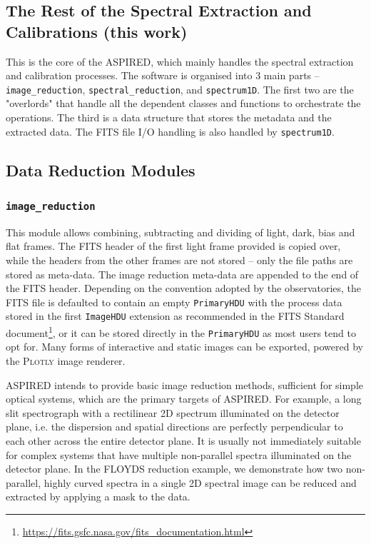 \documentclass[fleqn,usenatbib]{mnras}
\begin{document}
\subsection*{The Rest of the Spectral Extraction and Calibrations (this work)}
This is the core of the \textsc{ASPIRED}, which mainly handles the spectral
extraction and calibration processes. The software is organised into
3 main parts -- \texttt{image\_reduction}, \texttt{spectral\_reduction},
and \texttt{spectrum1D}. The first two are the "overlords" that handle
all the dependent classes and functions to orchestrate the operations.
The third is a data structure that stores the metadata and the extracted
data. The FITS file I/O handling is also handled by \texttt{spectrum1D}.


\subsection{Data Reduction Modules}

\subsubsection{\texttt{image\_reduction}}
This module allows combining, subtracting and dividing of light,
dark, bias and flat frames. The FITS header of the first light frame provided
is copied over, while the headers from the other frames are not stored -- only
the file paths are stored as meta-data. The image reduction meta-data
are appended to the end of the FITS header. Depending on the convention
adopted by the observatories, the FITS file is defaulted to contain an empty \texttt{PrimaryHDU}
with the process data stored in the first \texttt{ImageHDU} extension as
recommended in the FITS Standard 
document\footnote{\url{https://fits.gsfc.nasa.gov/fits_documentation.html}},
or it can be stored directly in the \texttt{PrimaryHDU} as most users tend
to opt for. Many forms of interactive and static images can be exported,
powered by the \textsc{Plotly} image renderer.

\textsc{ASPIRED} intends to provide basic image reduction methods, sufficient for simple
optical systems, which are the primary targets of \textsc{ASPIRED}. For
example, a long slit spectrograph with a rectilinear 2D spectrum illuminated
on the detector plane, i.e. the dispersion and spatial directions are perfectly
perpendicular to each other across the entire detector plane. It is usually
not immediately suitable for complex systems that have multiple non-parallel
spectra illuminated on the detector plane. In the FLOYDS reduction example,
we demonstrate how two non-parallel, highly curved spectra in a single
2D spectral image can be reduced and extracted by applying a mask to the
data.
\end{document}

